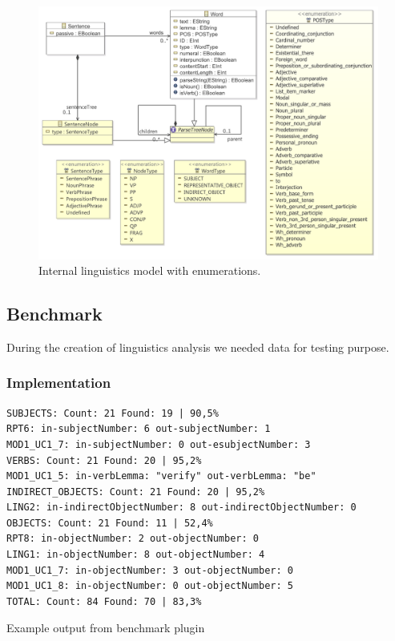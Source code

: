 \begin{figure}[ht]
  \centering
  \includegraphics[width=\textwidth]{images/ReprotoolLingModel}
  \caption{Internal linguistics model with enumerations.}
  \label{fig:ReprotoolLingModel}
\end{figure}

\subsection{Benchmark}
\label{sec:benchmark}

During the creation of linguistics analysis we needed data for testing purpose.

\subsubsection{Implementation}

\begin{table}[ht]   %
\begin{center}
    \begin{verbatim}
SUBJECTS: Count: 21 Found: 19 | 90,5%
RPT6: in-subjectNumber: 6 out-subjectNumber: 1
MOD1_UC1_7: in-subjectNumber: 0 out-esubjectNumber: 3
VERBS: Count: 21 Found: 20 | 95,2%
MOD1_UC1_5: in-verbLemma: "verify" out-verbLemma: "be"
INDIRECT_OBJECTS: Count: 21 Found: 20 | 95,2%
LING2: in-indirectObjectNumber: 8 out-indirectObjectNumber: 0
OBJECTS: Count: 21 Found: 11 | 52,4%
RPT8: in-objectNumber: 2 out-objectNumber: 0
LING1: in-objectNumber: 8 out-objectNumber: 4
MOD1_UC1_7: in-objectNumber: 3 out-objectNumber: 0
MOD1_UC1_8: in-objectNumber: 0 out-objectNumber: 5
TOTAL: Count: 84 Found: 70 | 83,3%   
    \end{verbatim}
  \caption{Example output from benchmark plugin}
  \label{tab.benchmarkexample}
\end{center}
\end{table}   
      
